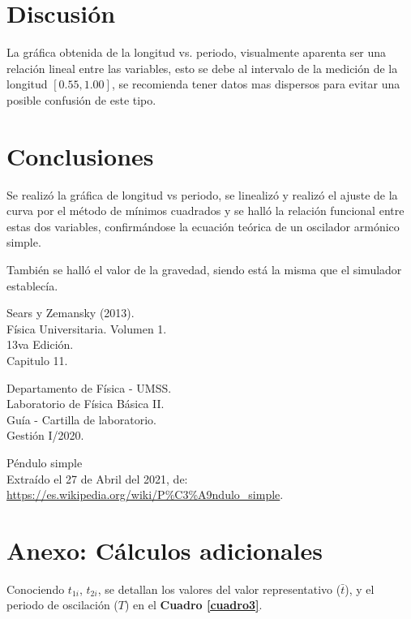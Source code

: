 \documentclass[letter,11pt]{article}
\begin{document}
\section{Discusión}

La gráfica obtenida de la longitud vs. periodo, visualmente aparenta ser una
relación lineal entre las variables, esto se debe al intervalo de la medición
de la longitud $[0.55, 1.00]$, se recomienda tener datos mas dispersos para
evitar una posible confusión de este tipo.

\section{Conclusiones}

Se realizó la gráfica de longitud vs periodo, se linealizó y realizó el ajuste
de la curva por el método de mínimos cuadrados y se halló la relación funcional
entre estas dos variables, confirmándose la ecuación teórica de un oscilador
armónico simple.

También se halló el valor de la gravedad, siendo está la misma que el simulador
establecía.

\begin{thebibliography}{99}

 Sears y Zemansky (2013).\\
Física Universitaria. Volumen 1.\\
13va Edición.\\
Capitulo 11.

 Departamento de Física - UMSS.\\
Laboratorio de Física Básica II.\\
Guía - Cartilla de laboratorio.\\
Gestión I/2020.

 Péndulo simple \\
Extraído el 27 de Abril del 2021, de: \\
\url{https://es.wikipedia.org/wiki/P%C3%A9ndulo_simple}.

\end{thebibliography}

\newpage
\section*{Anexo: Cálculos adicionales}

Conociendo $t_{1i}$, $t_{2i}$, se detallan los valores del valor representativo
($\bar{t}$), y el periodo de oscilación ($T$) en el
\textbf{Cuadro \ref{cuadro3}}.
\end{document}

